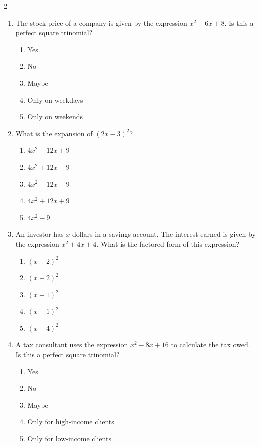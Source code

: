 \documentclass[10pt]{article}
\begin{document}
\begin{multicols}{2}
\begin{enumerate}[label=\textbf{Q\arabic*.}, leftmargin=*, itemsep=6pt, parsep=0pt]
  \item \small The stock price of a company is given by the expression $x^2 - 6x + 8$. Is this a perfect square trinomial?
  \begin{enumerate}[label=(\Alph*), leftmargin=0.6cm, nosep, itemsep=2pt]
    \item Yes
    \item No
    \item Maybe
    \item Only on weekdays
    \item Only on weekends
  \end{enumerate}

  \item \small What is the expansion of $(2x - 3)^2$?
  \begin{enumerate}[label=(\Alph*), leftmargin=0.6cm, nosep, itemsep=2pt]
    \item $4x^2 - 12x + 9$
    \item $4x^2 + 12x - 9$
    \item $4x^2 - 12x - 9$
    \item $4x^2 + 12x + 9$
    \item $4x^2 - 9$
  \end{enumerate}

  \item \small An investor has $x$ dollars in a savings account. The interest earned is given by the expression $x^2 + 4x + 4$. What is the factored form of this expression?
  \begin{enumerate}[label=(\Alph*), leftmargin=0.6cm, nosep, itemsep=2pt]
    \item $(x + 2)^2$
    \item $(x - 2)^2$
    \item $(x + 1)^2$
    \item $(x - 1)^2$
    \item $(x + 4)^2$
  \end{enumerate}

  \item \small A tax consultant uses the expression $x^2 - 8x + 16$ to calculate the tax owed. Is this a perfect square trinomial?
  \begin{enumerate}[label=(\Alph*), leftmargin=0.6cm, nosep, itemsep=2pt]
    \item Yes
    \item No
    \item Maybe
    \item Only for high-income clients
    \item Only for low-income clients
  \end{enumerate}


\end{enumerate}
\end{multicols}
\end{document}
